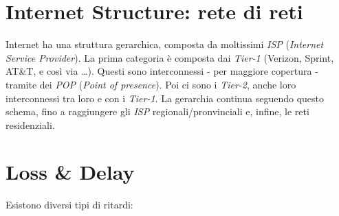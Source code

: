 \section{Internet Structure: rete di reti}
Internet ha una struttura gerarchica, composta da moltissimi \textit{ISP} (\textit{Internet Service Provider}).
La prima categoria è composta dai \textit{Tier-1} (Verizon, Sprint, AT\&T, e così via \ldots). Questi sono interconnessi - per maggiore copertura - tramite dei \textit{POP} (\textit{Point of presence}).
Poi ci sono i \textit{Tier-2}, anche loro interconnessi tra loro e con i \textit{Tier-1}.
La gerarchia continua seguendo questo schema, fino a raggiungere gli \textit{ISP} regionali/pronvinciali e, infine, le reti residenziali.
\newpage

\section{Loss \& Delay}
Esistono diversi tipi di ritardi:
